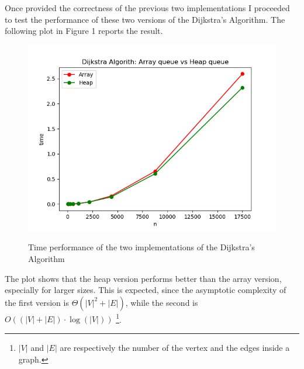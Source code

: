\documentclass{article}
\begin{document}
	\noindent Once provided the correctness of the previous two implementations I proceeded to test the performance of these two versions of the Dijkstra's Algorithm. The following plot in Figure 1 reports the result.
	\newpage
	\begin{figure}[th]
			\centering
			\includegraphics[width=.7\textwidth]{../plot/plot.png}
			\label{plot}
			\caption{Time performance of the two implementations of the Dijkstra's Algorithm}
	\end{figure}
	\noindent The plot shows that the heap version performs better than the array version, especially for larger sizes. This is expected, since the asymptotic complexity of the first version is $\Theta(|V|^2 + |E|)$, while the second is $O ( (|V| + |E| ) \cdot \log{(|V|)} )$  \footnote{$|V|$ and $|E|$ are respectively the number of the vertex and the edges inside a graph.}.
\end{document}
